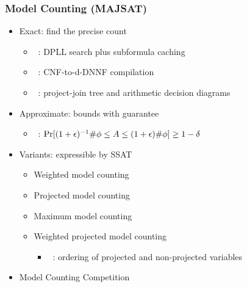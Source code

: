 \begin{frame}
      \frametitle{Model Counting (MAJSAT)}
      \begin{itemize}
            \item Exact: find the precise count
                  \begin{itemize}
                        \item \cachet~\cite{Sang2004,Sang2005ModelCounting}: DPLL search plus subformula caching
                        \item \ctwod~\cite{Darwiche2001,Darwiche2002dDNNF}: CNF-to-d-DNNF compilation
                        \item \dpmc~\cite{Dudek2020}: project-join tree and arithmetic decision diagrams
                  \end{itemize}
                  \pause
            \item Approximate: bounds with guarantee
                  \begin{itemize}
                        \item \approxmc~\cite{Chakraborty2013,Chakraborty2016}: $\Pr[(1+\epsilon)^{-1}\#\phi \leq A \leq (1+\epsilon)\#\phi] \geq 1-\delta$
                  \end{itemize}
                  \pause
            \item Variants: expressible by SSAT
                  \begin{itemize}
                        \item Weighted model counting~\cite{Sang2005BayesianInference,Chavira2008}
                        \item Projected model counting~\cite{Aziz2015}
                        \item Maximum model counting~\cite{Fremont2017}
                        \item Weighted projected model counting
                              \begin{itemize}
                                    \item \procount~\cite{Dudek2021}: ordering of projected and non-projected variables
                              \end{itemize}
                  \end{itemize}
                  \pause
            \item Model Counting Competition~\cite{MC-COMP2020}
      \end{itemize}
\end{frame}

